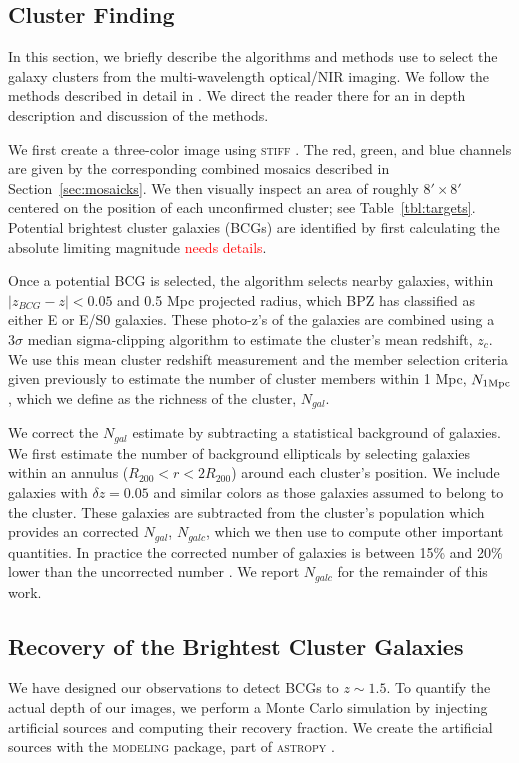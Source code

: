 \documentclass[apj, revtex4]{emulateapj}
\newcommand{\editorial}[1]{\textcolor{red}{#1}}
\begin{document}
\subsection{Cluster Finding}
In this section, we briefly describe the algorithms and methods use to select the galaxy clusters from the multi-wavelength optical/NIR imaging. We follow the methods described in detail in \cite{Menanteau2009a, Menanteau2010}. We direct the reader there for an in depth description and discussion of the methods.  

We first create a three-color image using \textsc{stiff} \citep{Bertin2011}. The red, green, and blue channels are given by the corresponding combined mosaics described in Section~\ref{sec:mosaicks}. We then visually inspect an area of roughly $8' \times 8'$ centered on the position of each unconfirmed cluster; see Table~\ref{tbl:targets}. Potential brightest cluster galaxies (BCGs) are identified by first calculating the absolute limiting magnitude \editorial{needs details}.

Once a potential BCG is selected, the algorithm selects nearby galaxies, within $|z_{BCG} - z| < 0.05$ and 0.5 Mpc projected radius, which BPZ has classified as either E or E/S0 galaxies. These photo-z's of the galaxies are combined using a $3\sigma$ median sigma-clipping algorithm to estimate the cluster's mean redshift, $z_c$. We use this mean cluster redshift measurement and the member selection criteria given previously to estimate the number of cluster members within 1 Mpc, $N_{1\rm Mpc}$, which we define as the richness of the cluster, $N_{gal}$.   

We correct the $N_{gal}$ estimate by subtracting a statistical background of galaxies. We first estimate the number of background ellipticals by selecting galaxies within an annulus ($R_{200} <r < 2R_{200}$) around each cluster's position. We include galaxies with $\delta z = 0.05$ and similar colors as those galaxies assumed to belong to the cluster. These galaxies are subtracted from the cluster's population which provides an corrected $N_{gal}$, $N_{galc}$, which we then use to compute other important quantities. In practice the corrected number of galaxies is between 15\% and 20\% lower than the uncorrected number \citep{Menanteau2010}. We report $N_{galc}$ for the remainder of this work.

\subsection{Recovery of the Brightest Cluster Galaxies}
We have designed our observations to detect BCGs to $z\sim1.5$. To quantify the actual depth of our images, we perform a Monte Carlo simulation by injecting artificial sources and computing their recovery fraction. We create the artificial sources with the \textsc{modeling} package, part of \textsc{astropy} \citep{TheAstropyCollaboration2013}.
\end{document}
